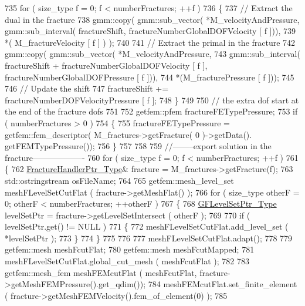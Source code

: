 \begin{DoxyCode}
735     \textcolor{keywordflow}{for} ( size\_type f = 0; f < numberFractures; ++f )
736     \{ 
737         \textcolor{comment}{// Extract the dual in the fracture}
738         gmm::copy( gmm::sub\_vector( *M\_velocityAndPressure, gmm::sub\_interval( fractureShift, 
      fractureNumberGlobalDOFVelocity [ f ])),
739                   *( M\_fractureVelocity [ f ] ) );
740 
741         \textcolor{comment}{// Extract the primal in the fracture}
742         gmm::copy( gmm::sub\_vector( *M\_velocityAndPressure, 
743                                     gmm::sub\_interval( fractureShift + fractureNumberGlobalDOFVelocity [ f 
      ], fractureNumberGlobalDOFPressure [ f ])), 
744                    *(M\_fracturePressure [ f ]));
745 
746         \textcolor{comment}{// Update the shift}
747         fractureShift += fractureNumberDOFVelocityPressure [ f ];
748     \}
749 
750     \textcolor{comment}{// the extra dof start at the end of the fracture dofs}
751   
752     getfem::pfem fractureFETypePressure;
753     \textcolor{keywordflow}{if} ( numberFractures > 0 )
754     \{
755         fractureFETypePressure = getfem::fem\_descriptor( M\_fractures->getFracture( 0 )->getData().
      getFEMTypePressure());
756     \}
757 
758 
759     \textcolor{comment}{//--------export solution in the fracture-------------------}
760     \textcolor{keywordflow}{for} ( size\_type f = 0; f < numberFractures; ++f )
761     \{
762         \hyperlink{FractureHandler_8h_af23fb7a30aaff864bd42587af4f1e78a}{FractureHandlerPtr\_Type}& fracture = M\_fractures->getFracture(f);
763         std::ostringstream osFileName;
764 
765         getfem::mesh\_level\_set meshFLevelSetCutFlat ( fracture->getMeshFlat() );
766         \textcolor{keywordflow}{for} ( size\_type otherF = 0; otherF < numberFractures; ++otherF )
767         \{
768             \hyperlink{Core_8h_a036173458a8a25c7c03f8c76d97e9580}{GFLevelSetPtr\_Type} levelSetPtr = fracture->getLevelSetIntersect ( otherF );
769 
770             \textcolor{keywordflow}{if} ( levelSetPtr.get() != NULL )
771             \{
772                 meshFLevelSetCutFlat.add\_level\_set ( *levelSetPtr );
773             \}
774         \}
775 
776 
777         meshFLevelSetCutFlat.adapt();
778 
779         getfem::mesh meshFcutFlat;
780         getfem::mesh meshFcutMapped;
781         meshFLevelSetCutFlat.global\_cut\_mesh ( meshFcutFlat );
782 
783         getfem::mesh\_fem meshFEMcutFlat ( meshFcutFlat, fracture->getMeshFEMPressure().get\_qdim());
784         meshFEMcutFlat.set\_finite\_element ( fracture->getMeshFEMVelocity().fem\_of\_element(0) );
785 

\end{DoxyCode}
